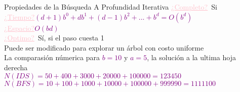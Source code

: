 \begin{frame}{Propiedades de la Búsqueda A Profundidad Iterativa}
	\small{	
            \textcolor{Pink}{\underline{¿Completo?}}\, Si
            \\
            \textcolor{Pink}{\underline{¿Tiempo?}}\;\textcolor{Purple}{$(d+ 1)b^0+db^1+ (d-1)b^2 + ... + b^d= O(b^d)$}
            \\
            \textcolor{Pink}{\underline{¿Espacio?}}\;\textcolor{Purple}{$O(bd)$}
            \\
            \textcolor{Pink}{\underline{¿Optimo?}}\, Sí, si el paso cuesta 1 
            \\
            Puede ser modificado para explorar un árbol con costo uniforme
            \\
            La comparasión númerica para \textcolor{Purple}{$b = 10$} y \textcolor{Purple}{$a = 5$}, la solución a la ultima hoja derecha
            \\
            \textcolor{Purple}{$N(IDS) = 50 + 400 + 3000 + 20000 + 100000 = 123450$}
            \\
            \textcolor{Purple}{$N(BFS) = 10 + 100 + 1000 + 10000 + 100000 + 999990 = 1111100$}
    }
\end{frame}
